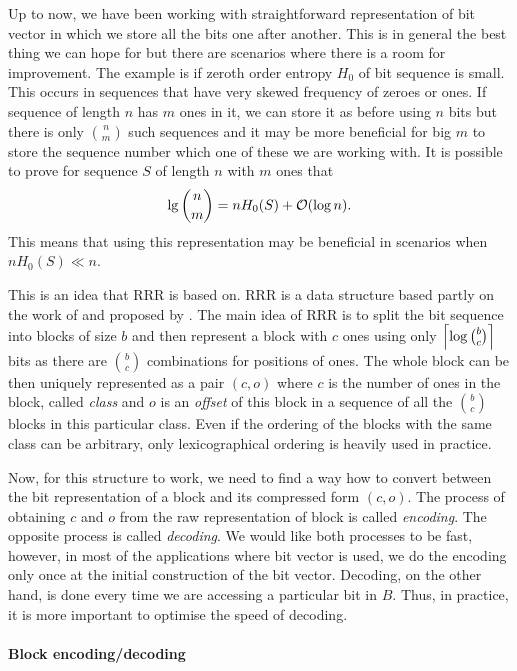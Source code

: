 Up to now, we have been working with straightforward representation of bit vector in which we store
all the bits one after another. This is in general the best thing we can hope for but there are scenarios
where there is a room for improvement. The example is if zeroth order entropy $H_0$ of bit sequence
is small. This occurs in sequences that have very skewed frequency of zeroes or ones. If sequence of
length $n$ has $m$ ones in it, we can store it as before using $n$ bits but there is only ${n \choose m}$
such sequences and it may be more beneficial for big $m$ to store the sequence number which one of these
we are working with. It is possible to prove for sequence $S$ of length $n$ with $m$ ones that
$$\mathop{\mathrm{lg}} {n \choose m} = nH_0(S)+\mathcal{O}(\log n).$$ This means that using this representation may be
beneficial in scenarios when $nH_0(S)\ll n$.

This is an idea that RRR is based on. RRR is a data structure based partly on the work of \cite{pagh2001low}
and proposed by \cite{raman2007succinct}. The main idea of RRR is to split the bit sequence into blocks of size
$b$ and then represent a block with $c$ ones using only $\left\lceil \log {b \choose c} \right\rceil$ bits as
there are ${b \choose c}$ combinations for positions of ones. The whole block can be then uniquely
represented as a pair $(c, o)$ where $c$ is the number of ones in the block, called \emph{class} and
$o$ is an \emph{offset} of this block in a sequence of all the ${b \choose c}$ blocks in this particular class.
Even if the ordering of the blocks with the same class can be arbitrary, only lexicographical ordering
is heavily used in practice.

Now, for this structure to work, we need to find a way how to convert between the bit representation of
a block and its compressed form $(c, o)$. The process of obtaining $c$ and $o$ from the raw representation
of block is called \textit{encoding}. The opposite process is called \textit{decoding}. We would like both
processes to be fast, however, in most of the applications where bit vector is used, we do the encoding only
once at the initial construction of the bit vector. Decoding, on the other hand, is done every time we are
accessing a particular bit in $B$. Thus, in practice, it is more important to optimise the speed of decoding.

\paragraph{Block encoding/decoding}

